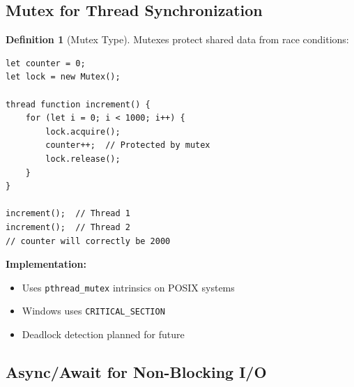 \documentclass[12pt,a4paper]{article}
\theoremstyle{definition}
\newtheorem{definition}{Definition}[section]
\begin{document}
\subsection{Mutex for Thread Synchronization}

\begin{definition}[Mutex Type]
Mutexes protect shared data from race conditions:

\begin{lstlisting}[language=Dryad]
let counter = 0;
let lock = new Mutex();

thread function increment() {
    for (let i = 0; i < 1000; i++) {
        lock.acquire();
        counter++;  // Protected by mutex
        lock.release();
    }
}

increment();  // Thread 1
increment();  // Thread 2
// counter will correctly be 2000
\end{lstlisting}

\textbf{Implementation:}
\begin{itemize}[leftmargin=*]
    \item Uses \texttt{pthread\_mutex} intrinsics on POSIX systems
    \item Windows uses \texttt{CRITICAL\_SECTION}
    \item Deadlock detection planned for future
\end{itemize}
\end{definition}

\subsection{Async/Await for Non-Blocking I/O}
\end{document}
